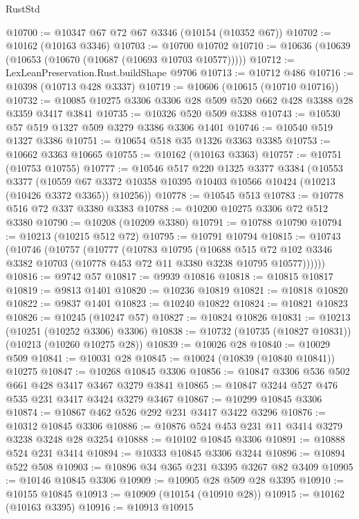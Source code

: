 \begin{lexlean}{RustStd}
\begin{coremodule}
@10700 := @10347 @67 @72 @67 @3346 (@10154 (@10352 @67))
@10702 := @10162 (@10163 @3346)
@10703 := @10700 @10702
@10710 := @10636 (@10639 (@10653 (@10670 (@10687 (@10693 @10703 @10577)))))
@10712 := LexLeanPreservation.Rust.buildShape @9706
@10713 := @10712 @486
@10716 := @10398 (@10713 @428 @3337)
@10719 := @10606 (@10615 (@10710 @10716))
@10732 := @10085 @10275 @3306 @3306 @28 @509 @520 @662 @428 @3388 @28 @3359 @3417 @3841
@10735 := @10326 @520 @509 @3388
@10743 := @10530 @57 @519 @1327 @509 @3279 @3386 @3306 @1401
@10746 := @10540 @519 @1327 @3386
@10751 := @10654 @518 @35 @1326 @3363 @3385
@10753 := @10662 @3363 @10665
@10755 := @10162 (@10163 @3363)
@10757 := @10751 (@10753 @10755)
@10777 := @10546
    @517
    @220
    @1325
    @3377
    @3384
    (@10553
      @3377
      (@10559 @67 @3372 @10358 @10395 @10403 @10566 @10424 (@10213 (@10426 @3372 @3365)) @10256))
@10778 := @10545 @513
@10783 := @10778 @516 @72 @337 @3380 @3383
@10788 := @10200 @10275 @3306 @72 @512 @3380
@10790 := @10208 (@10209 @3380)
@10791 := @10788 @10790
@10794 := @10213 (@10215 @512 @72)
@10795 := @10791 @10794
@10815 := @10743
    (@10746
      (@10757
        (@10777
          (@10783
            @10795
            (@10688
              @515
              @72
              @102
              @3346
              @3382
              @10703
              (@10778 @453 @72 @11 @3380 @3238 @10795 @10577))))))
@10816 := @9742 @57
@10817 := @9939 @10816
@10818 := @10815 @10817
@10819 := @9813 @1401
@10820 := @10236 @10819
@10821 := @10818 @10820
@10822 := @9837 @1401
@10823 := @10240 @10822
@10824 := @10821 @10823
@10826 := @10245 (@10247 @57)
@10827 := @10824 @10826
@10831 := @10213 (@10251 (@10252 @3306) @3306)
@10838 := @10732 (@10735 (@10827 @10831)) (@10213 (@10260 @10275 @28))
@10839 := @10026 @28
@10840 := @10029 @509
@10841 := @10031 @28
@10845 := @10024 (@10839 (@10840 @10841)) @10275
@10847 := @10268 @10845 @3306
@10856 := @10847 @3306 @536 @502 @661 @428 @3417 @3467 @3279 @3841
@10865 := @10847 @3244 @527 @476 @535 @231 @3417 @3424 @3279 @3467
@10867 := @10299 @10845 @3306
@10874 := @10867 @462 @526 @292 @231 @3417 @3422 @3296
@10876 := @10312 @10845 @3306
@10886 := @10876 @524 @453 @231 @11 @3414 @3279 @3238 @3248 @28 @3254
@10888 := @10102 @10845 @3306
@10891 := @10888 @524 @231 @3414
@10894 := @10333 @10845 @3306 @3244
@10896 := @10894 @522 @508
@10903 := @10896 @34 @365 @231 @3395 @3267 @82 @3409
@10905 := @10146 @10845 @3306
@10909 := @10905 @28 @509 @28 @3395
@10910 := @10155 @10845
@10913 := @10909 (@10154 (@10910 @28))
@10915 := @10162 (@10163 @3395)
@10916 := @10913 @10915

\end{coremodule}
\end{lexlean}
